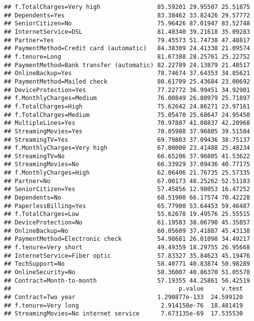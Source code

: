 \documentclass[
  a4paper]{article}
\begin{document}
\begin{verbatim}
## f.TotalCharges=Very high                85.59201 29.95507 25.51875
## Dependents=Yes                          83.38462 33.82426 29.57772
## SeniorCitizen=No                        75.96426 87.01947 83.52748
## InternetService=DSL                     81.48340 39.21618 35.09283
## Partner=Yes                             79.45573 51.74738 47.48817
## PaymentMethod=Credit card (automatic)   84.38309 24.41338 21.09574
## f.tenure=Long                           81.67388 28.25761 25.22752
## PaymentMethod=Bank transfer (automatic) 82.22789 24.13879 21.40517
## OnlineBackup=Yes                        78.74674 37.64353 34.85621
## PaymentMethod=Mailed check              80.61709 25.43684 23.00692
## DeviceProtection=Yes                    77.22772 36.99451 34.92901
## f.MonthlyCharges=Medium                 76.00849 26.80979 25.71897
## f.TotalCharges=High                     75.62642 24.86271 23.97161
## f.TotalCharges=Medium                   75.05470 25.68647 24.95450
## MultipleLines=Yes                       70.97887 41.08837 42.20968
## StreamingMovies=Yes                     70.05988 37.96805 39.51584
## StreamingTV=Yes                         69.79803 37.09436 38.75137
## f.MonthlyCharges=Very high              67.00000 23.41488 25.48234
## StreamingTV=No                          66.65206 37.96805 41.53622
## StreamingMovies=No                      66.33929 37.09436 40.77175
## f.MonthlyCharges=High                   62.06406 21.76735 25.57335
## Partner=No                              67.00173 48.25262 52.51183
## SeniorCitizen=Yes                       57.45856 12.98053 16.47252
## Dependents=No                           68.51900 66.17574 70.42228
## PaperlessBilling=Yes                    65.77900 53.64453 59.46487
## f.TotalCharges=Low                      55.62678 19.49576 25.55515
## DeviceProtection=No                     61.19583 38.06790 45.35857
## OnlineBackup=No                         60.05609 37.41887 45.43138
## PaymentMethod=Electronic check          54.98681 26.01098 34.49217
## f.tenure=Very short                     49.49359 18.29755 26.95668
## InternetService=Fiber optic             57.83327 35.84623 45.19476
## TechSupport=No                          58.40771 40.83874 50.98289
## OnlineSecurity=No                       58.36007 40.86370 51.05570
## Contract=Month-to-month                 57.19355 44.25861 56.42519
##                                               p.value     v.test
## Contract=Two year                       1.290877e-133  24.599120
## f.tenure=Very long                       2.914158e-76  18.481419
## StreamingMovies=No internet service      7.673135e-69  17.535530

\end{verbatim}
\end{document}
